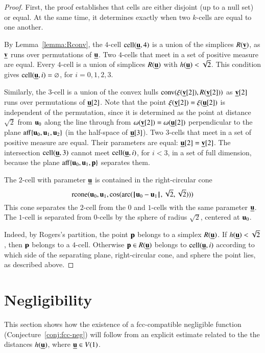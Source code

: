 \begin{proof}  First, the proof establishes that cells are either disjoint (up to a null set) or equal.  At the same time, it determines exactly when two $k$-cells are equal to one another. 

By Lemma~\ref{lemma:Rconv}, the $4$-cell $\operatorname{cell}({\underline{{\mathbf u}}},4)$ is a union of the simplices $R({\underline{{\mathbf v}}})$, as ${\underline{{\mathbf v}}}$ runs over permutations of ${\underline{{\mathbf u}}}$.   Two $4$-cells that meet in a set of positive measure are equal.  Every $4$-cell is a union of simplices $R({\underline{{\mathbf u}}})$ with $h({\underline{{\mathbf u}}})<\sqrt2$.  This condition gives $\operatorname{cell}({\underline{{\mathbf u}}},i)=\varnothing$, for $i=0,1,2,3$.

Similarly, the $3$-cell is a union
of the convex hulls ${\operatorname{conv}}(\xi({\underline{{\mathbf v}}}[2]),R({\underline{{\mathbf v}}}[2]))$ as ${\underline{{\mathbf v}}}[2]$ runs over permutations of ${\underline{{\mathbf u}}}[2]$.  Note that the point $\xi({\underline{{\mathbf v}}}[2])=\xi({\underline{{\mathbf u}}}[2])$ is independent of the permutation, since
it is determined as the point at distance $\sqrt2$ from $ {\mathbf u}_0$ along the line through
from $\omega({\underline{{\mathbf v}}}[2])=\omega({\underline{{\mathbf u}}}[2])$ perpendicular to the plane ${\operatorname{aff}}\{ {\mathbf u}_0, {\mathbf u}_1, {\mathbf u}_2\}$
(in the half-space of ${\underline{{\mathbf u}}}[3]$). Two $3$-cells that meet in a set of positive measure are equal.  Their parameters are equal: ${\underline{{\mathbf u}}}[2]={\underline{{\mathbf v}}}[2]$.    The intersection $\operatorname{cell}({\underline{{\mathbf u}}},3)$ cannot meet $\operatorname{cell}({\underline{{\mathbf u}}},i)$, for $i<3$, in a set of full dimension, because the plane ${\operatorname{aff}}\{ {\mathbf u}_0, {\mathbf u}_1,{\mathbf p}\}$ separates them.

The $2$-cell with parameter ${\underline{{\mathbf u}}}$ is contained in the right-circular cone
\begin{displaymath}
{\operatorname{rcone}}( {\mathbf u}_0, {\mathbf u}_1,\cos({\operatorname{arc}}({\hskip0.1em|\hskip-0.15em|\hskip0.1em} {\mathbf u}_0 -  {\mathbf u}_1{\hskip0.1em|\hskip-0.15em|\hskip0.1em},\sqrt2,\sqrt2)))
\end{displaymath}
This cone separates the $2$-cell from the $0$ and $1$-cells with the same parameter ${\underline{{\mathbf u}}}$.
The $1$-cell is separated from $0$-cells by the sphere
of radius $\sqrt2$, centered at $ {\mathbf u}_0$.

  Indeed, by Rogers's
partition, the point ${\mathbf p}$ belongs to a  simplex $R({\underline{{\mathbf u}}})$.  If $h({\underline{{\mathbf u}}})<\sqrt2$, then
${\mathbf p}$ belongs to a $4$-cell.  Otherwise ${\mathbf p}\in R({\underline{{\mathbf u}}})$ belongs to $\operatorname{cell}({\underline{{\mathbf u}}},i)$ according to
which side of the separating plane, right-circular cone, and sphere  the point
lies, as described above.
\end{proof}


\section{Negligibility}

This section shows how the existence of a fcc-compatible negligible function (Conjecture~\ref{conj:fcc-neg}) will follow from an explicit estimate
related to the the distances $h({\underline{{\mathbf u}}})$, where ${\underline{{\mathbf u}}}\in V(1)$.

